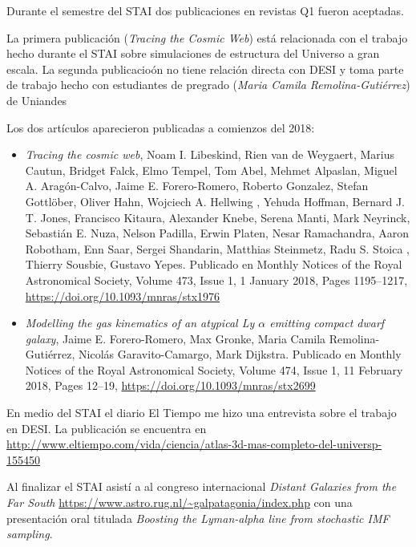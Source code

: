 \documentclass[12pt,spanish]{article}
\begin{document}
Durante el semestre del STAI dos publicaciones en revistas Q1 fueron
aceptadas.

La primera publicaci\'on (\emph{Tracing the Cosmic Web}) est\'a
relacionada con el trabajo hecho durante el STAI sobre simulaciones
de estructura del Universo a gran escala. 
La segunda publicacio\'on no tiene relaci\'on directa con DESI y toma
parte de trabajo hecho con estudiantes de pregrado (\emph{Maria Camila
  Remolina-Guti\'errez}) de Uniandes


Los dos art\'iculos aparecieron publicadas a comienzos del 2018:

\begin{itemize}

\item{{\it Tracing the cosmic web}, Noam I. Libeskind,  Rien van de
  Weygaert,  Marius Cautun,  Bridget Falck, Elmo Tempel,  Tom Abel,  Mehmet
  Alpaslan,  Miguel A. Aragón-Calvo, Jaime E. Forero-Romero,  Roberto
  Gonzalez,  Stefan Gottlöber,  Oliver Hahn, Wojciech A. Hellwing , Yehuda
  Hoffman,  Bernard J. T. Jones,  Francisco Kitaura, Alexander Knebe,
  Serena Manti,  Mark Neyrinck,  Sebastián E. Nuza, Nelson Padilla,  Erwin
  Platen,  Nesar Ramachandra,  Aaron Robotham,  Enn Saar, Sergei Shandarin,
  Matthias Steinmetz,  Radu S. Stoica , Thierry Sousbie, Gustavo Yepes. 
Publicado en Monthly Notices of the Royal Astronomical Society, Volume
473, Issue 1, 1 January 2018, Pages 1195–1217,
\url{https://doi.org/10.1093/mnras/stx1976}}
\item{{\it Modelling the gas kinematics of an atypical Ly $\alpha$ emitting
    compact dwarf galaxy}, Jaime E. Forero-Romero,  Max Gronke,  Maria
  Camila Remolina-Gutiérrez, Nicolás Garavito-Camargo,  Mark Dijkstra.
  Publicado en Monthly Notices of the Royal Astronomical Society,
  Volume 474, Issue 1, 11 February 2018, Pages 12–19,
  \url{https://doi.org/10.1093/mnras/stx2699}} 

\end{itemize}

En medio del STAI el diario El Tiempo me hizo una entrevista sobre el
trabajo en DESI. La publicaci\'on se encuentra en \url{http://www.eltiempo.com/vida/ciencia/atlas-3d-mas-completo-del-universp-155450}

Al finalizar el STAI asist\'i a al congreso internacional
\emph{Distant Galaxies from the Far South}
\url{https://www.astro.rug.nl/~galpatagonia/index.php} con una
presentaci\'on oral titulada \emph{Boosting the Lyman-alpha
line from stochastic IMF sampling}.
\end{document}
